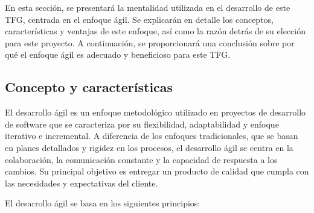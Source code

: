 En esta sección, se presentará la mentalidad utilizada en el desarrollo de este TFG, centrada en el enfoque ágil. Se explicarán en detalle los conceptos, características y ventajas de este enfoque, así como la razón detrás de su elección para este proyecto. A continuación, se proporcionará una conclusión sobre por qué el enfoque ágil es adecuado y beneficioso para este TFG.

\subsection{Concepto y características}

El desarrollo ágil es un enfoque metodológico utilizado en proyectos de desarrollo de software que se caracteriza por su flexibilidad, adaptabilidad y enfoque iterativo e incremental. A diferencia de los enfoques tradicionales, que se basan en planes detallados y rigidez en los procesos, el desarrollo ágil se centra en la colaboración, la comunicación constante y la capacidad de respuesta a los cambios. Su principal objetivo es entregar un producto de calidad que cumpla con las necesidades y expectativas del cliente.

El desarrollo ágil se basa en los siguientes principios:

